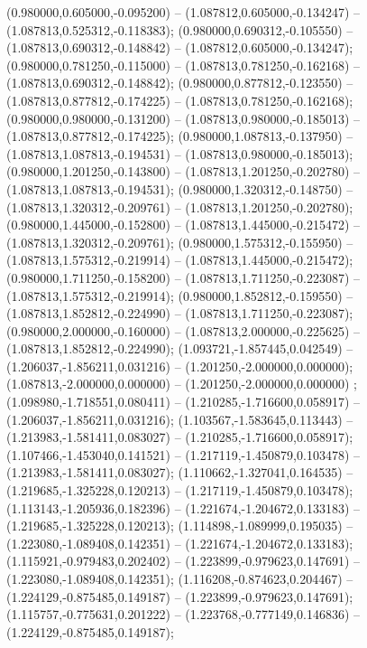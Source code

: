  (0.980000,0.605000,-0.095200) -- (1.087812,0.605000,-0.134247) -- (1.087813,0.525312,-0.118383);
 (0.980000,0.690312,-0.105550) -- (1.087813,0.690312,-0.148842) -- (1.087812,0.605000,-0.134247);
 (0.980000,0.781250,-0.115000) -- (1.087813,0.781250,-0.162168) -- (1.087813,0.690312,-0.148842);
 (0.980000,0.877812,-0.123550) -- (1.087813,0.877812,-0.174225) -- (1.087813,0.781250,-0.162168);
 (0.980000,0.980000,-0.131200) -- (1.087813,0.980000,-0.185013) -- (1.087813,0.877812,-0.174225);
 (0.980000,1.087813,-0.137950) -- (1.087813,1.087813,-0.194531) -- (1.087813,0.980000,-0.185013);
 (0.980000,1.201250,-0.143800) -- (1.087813,1.201250,-0.202780) -- (1.087813,1.087813,-0.194531);
 (0.980000,1.320312,-0.148750) -- (1.087813,1.320312,-0.209761) -- (1.087813,1.201250,-0.202780);
 (0.980000,1.445000,-0.152800) -- (1.087813,1.445000,-0.215472) -- (1.087813,1.320312,-0.209761);
 (0.980000,1.575312,-0.155950) -- (1.087813,1.575312,-0.219914) -- (1.087813,1.445000,-0.215472);
 (0.980000,1.711250,-0.158200) -- (1.087813,1.711250,-0.223087) -- (1.087813,1.575312,-0.219914);
 (0.980000,1.852812,-0.159550) -- (1.087813,1.852812,-0.224990) -- (1.087813,1.711250,-0.223087);
 (0.980000,2.000000,-0.160000) -- (1.087813,2.000000,-0.225625) -- (1.087813,1.852812,-0.224990);
 (1.093721,-1.857445,0.042549) -- (1.206037,-1.856211,0.031216) -- (1.201250,-2.000000,0.000000);
 (1.087813,-2.000000,0.000000) -- (1.201250,-2.000000,0.000000) ;
 (1.098980,-1.718551,0.080411) -- (1.210285,-1.716600,0.058917) -- (1.206037,-1.856211,0.031216);
 (1.103567,-1.583645,0.113443) -- (1.213983,-1.581411,0.083027) -- (1.210285,-1.716600,0.058917);
 (1.107466,-1.453040,0.141521) -- (1.217119,-1.450879,0.103478) -- (1.213983,-1.581411,0.083027);
 (1.110662,-1.327041,0.164535) -- (1.219685,-1.325228,0.120213) -- (1.217119,-1.450879,0.103478);
 (1.113143,-1.205936,0.182396) -- (1.221674,-1.204672,0.133183) -- (1.219685,-1.325228,0.120213);
 (1.114898,-1.089999,0.195035) -- (1.223080,-1.089408,0.142351) -- (1.221674,-1.204672,0.133183);
 (1.115921,-0.979483,0.202402) -- (1.223899,-0.979623,0.147691) -- (1.223080,-1.089408,0.142351);
 (1.116208,-0.874623,0.204467) -- (1.224129,-0.875485,0.149187) -- (1.223899,-0.979623,0.147691);
 (1.115757,-0.775631,0.201222) -- (1.223768,-0.777149,0.146836) -- (1.224129,-0.875485,0.149187);
